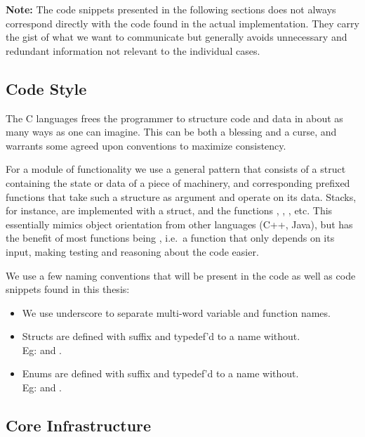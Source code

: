 \textbf{Note:} The code snippets presented in the following sections does not
always correspond directly with the code found in the actual
implementation. They carry the gist of what we want to communicate but generally
avoids unnecessary and redundant information not relevant to the individual
cases.

\subsection{Code Style}

The C languages frees the programmer to structure code and data in about as many
ways as one can imagine. This can be both a blessing and a curse, and warrants
some agreed upon conventions to maximize consistency.

For a module of functionality we use a general pattern that consists of a struct
containing the state or data of a piece of machinery, and corresponding prefixed
functions that take such a structure as argument and operate on its
data. Stacks, for instance, are implemented with a  struct, and the
functions , , , etc. This
essentially mimics object orientation from other languages (C++, Java), but has
the benefit of most functions being , i.e.~a function that only
depends on its input, making testing and reasoning about the code easier.

We use a few naming conventions that will be present in the code as well as code
snippets found in this thesis: %

\begin{itemize}
\item We use underscore to separate multi-word variable and function names.
\item Structs are defined with  suffix and typedef'd to a name
  without.\\Eg:  and .
\item Enums are defined with  suffix and typedef'd to a name
  without.\\Eg:  and .
\end{itemize}

\subsection{Core Infrastructure}

